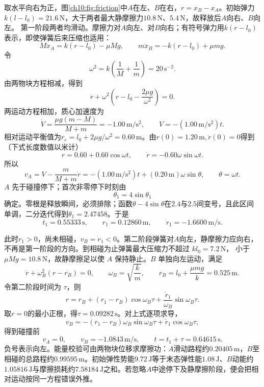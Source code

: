 \begin{xesolution}
取水平向右为正，图\ref{ch10:fig:friction}中$A$在左、$B$在右，$r=x_B-x_A$。初始弹力$k(l-l_0)=21.6\,\mathrm N$，大于两者最大静摩擦力$10.8\,\mathrm N$、$5.4\,\mathrm N$，故释放后$A$向右、$B$向左。
\chTenFrictionFigure
第一阶段两者均滑动。摩擦力对$A$向左、对$B$向右；有符号弹力用$k(r-l_0)$表示，即使弹簧后来压缩也适用：
\[
 M\ddot x_A=k(r-l_0)-\mu Mg,\qquad
 m\ddot x_B=-k(r-l_0)+\mu mg.
\]
令
\[
 \omega^2=k\left(\frac1M+\frac1m\right)=20\,\mathrm{s^{-2}}.
\]
由两物块方程相减，得到
\[
 \ddot r+\omega^2\left(r-l_0-\frac{2\mu g}{\omega^2}\right)=0.
\]
两运动方程相加，质心加速度为
\[
 \dot V=\frac{\mu g(m-M)}{M+m}=-1.00\,\mathrm{m/s^2},
 \qquad V=-(1.00\,\mathrm{m/s^2})t.
\]
相对运动平衡值为$r_e=l_0+2\mu g/\omega^2=0.60\,\mathrm m$。由$r(0)=1.20\,\mathrm m,\dot r(0)=0$得到（下式长度数值以米计）
\[
 r=0.60+0.60\cos\omega t,\qquad
 \dot r=-0.60\omega\sin\omega t.
\]
所以
\[
 v_A=V-\frac{m}{M+m}\dot r
 =-(1.00\,\mathrm{m/s^2})t+(0.20\,\mathrm m)\omega\sin\theta,
 \qquad \theta=\omega t.
\]
$A$ 先于碰撞停下；首次非零停下时刻由
\[
 \theta_1=4\sin\theta_1
\]
确定。零根是释放瞬间，必须排除；函数$\theta-4\sin\theta$在$2.4$与$2.5$间变号，且此区间单调，二分迭代得到$\theta_1=2.47458$。于是
\[
 t_1=0.55333\,\mathrm s,\qquad
 r_1=0.12860\,\mathrm m,\qquad
 \dot r_1=-1.6600\,\mathrm{m/s}.
\]

此时$r_1>0$，尚未相碰，$v_B=\dot r_1<0$。第二阶段弹簧对$A$向左，静摩擦力应向右，不再是第一阶段的方向。到相碰为止弹簧最大压缩力不超过 $kl_0=7.2\,\mathrm N$，
小于 $\mu Mg=10.8\,\mathrm N$，故静摩擦足以使 $A$ 保持静止。$B$ 单独向左运动，满足
\[
 \ddot r+\omega_B^2(r-r_B)=0,\qquad
 \omega_B=\sqrt{\frac{k}{m}},\qquad
 r_B=l_0+\frac{\mu mg}{k}=0.525\,\mathrm m.
\]
令第二阶段时间为 $\tau$，则
\[
 r=r_B+(r_1-r_B)\cos\omega_B\tau
 +\frac{\dot r_1}{\omega_B}\sin\omega_B\tau.
\]
取$r=0$的最小正根，得$\tau=0.09282\,\mathrm s$。对上式逐项求导，
\[
 v_B=-(r_1-r_B)\omega_B\sin\omega_B\tau+\dot r_1\cos\omega_B\tau,
\]
得到碰撞前
\[
 \boxed{v_A=0},\qquad
 \boxed{v_B=-1.0843\,\mathrm{m/s}},\qquad
 \boxed{t=t_1+\tau=0.64615\,\mathrm s}.
\]
负号表示向左。能量校验可由两物块位移求摩擦功：$A$滑动路程约$0.20405\,\mathrm m$，$B$至相碰的总路程约$0.99595\,\mathrm m$。初始弹性势能$9.72\,\mathrm J$等于末态弹性能$1.08\,\mathrm J$、$B$动能约$1.05816\,\mathrm J$与摩擦损耗约$7.58184\,\mathrm J$之和。若忽略$A$中途停下及静摩擦阶段，便会把相对运动按同一方程错误外推。
\end{xesolution}

